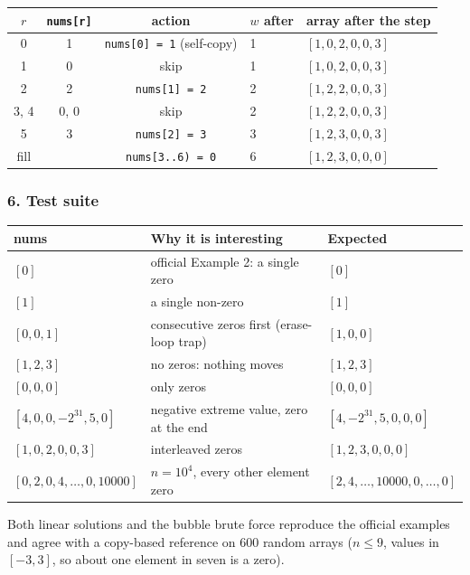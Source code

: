 \begin{tracebox}
\centering\small
\begin{tabular}{@{}cccll@{}}
\toprule
$r$ & \texttt{nums[r]} & \textbf{action} & $w$ after & \textbf{array after the step} \\
\midrule
0 & 1 & \texttt{nums[0] = 1} (self-copy) & 1 & $[1, 0, 2, 0, 0, 3]$ \\
1 & 0 & skip & 1 & $[1, 0, 2, 0, 0, 3]$ \\
2 & 2 & \texttt{nums[1] = 2} & 2 & $[1, 2, 2, 0, 0, 3]$ \\
3, 4 & 0, 0 & skip & 2 & $[1, 2, 2, 0, 0, 3]$ \\
5 & 3 & \texttt{nums[2] = 3} & 3 & $[1, 2, 3, 0, 0, 3]$ \\
fill & & \texttt{nums[3..6) = 0} & 6 & $[1, 2, 3, 0, 0, 0]$ \\
\bottomrule
\end{tabular}
\end{tracebox}

\subsubsection*{6. Test suite}

\begin{testbox}
\centering\small
\begin{tabular}{@{}lll@{}}
\toprule
\textbf{nums} & \textbf{Why it is interesting} & \textbf{Expected} \\
\midrule
$[0]$ & official Example 2: a single zero & $[0]$ \\
$[1]$ & a single non-zero & $[1]$ \\
$[0, 0, 1]$ & consecutive zeros first (erase-loop trap) & $[1, 0, 0]$ \\
$[1, 2, 3]$ & no zeros: nothing moves & $[1, 2, 3]$ \\
$[0, 0, 0]$ & only zeros & $[0, 0, 0]$ \\
$[4, 0, 0, -2^{31}, 5, 0]$ & negative extreme value, zero at the end & $[4, -2^{31}, 5, 0, 0, 0]$ \\
$[1, 0, 2, 0, 0, 3]$ & interleaved zeros & $[1, 2, 3, 0, 0, 0]$ \\
$[0, 2, 0, 4, \dots, 0, 10000]$ & $n = 10^4$, every other element zero & $[2, 4, \dots, 10000, 0, \dots, 0]$ \\
\bottomrule
\end{tabular}
\end{testbox}
Both linear solutions and the bubble brute force reproduce the official examples and agree with a copy-based reference on 600 random arrays ($n \le 9$, values in $[-3, 3]$, so about one element in seven is a zero).

